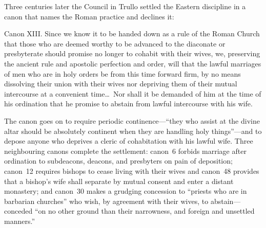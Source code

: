 Three centuries later the Council in Trullo settled the Eastern discipline in a canon that names the Roman practice and declines it:

\begin{studyframe}
Canon XIII. Since we know it to be handed down as a rule of the Roman Church that those who are deemed worthy to be advanced to the diaconate or presbyterate should promise no longer to cohabit with their wives, we, preserving the ancient rule and apostolic perfection and order, will that the lawful marriages of men who are in holy orders be from this time forward firm, by no means dissolving their union with their wives nor depriving them of their mutual intercourse at a convenient time\ldots\ Nor shall it be demanded of him at the time of his ordination that he promise to abstain from lawful intercourse with his wife.
\end{studyframe}

The canon goes on to require periodic continence---``they who assist at the divine altar should be absolutely continent when they are handling holy things''---and to depose anyone who deprives a cleric of cohabitation with his lawful wife. Three neighbouring canons complete the settlement: canon~6 forbids marriage after ordination to subdeacons, deacons, and presbyters on pain of deposition; canon~12 requires bishops to cease living with their wives and canon~48 provides that a bishop's wife shall separate by mutual consent and enter a distant monastery; and canon~30 makes a grudging concession to ``priests who are in barbarian churches'' who wish, by agreement with their wives, to abstain---conceded ``on no other ground than their narrowness, and foreign and unsettled manners.''

